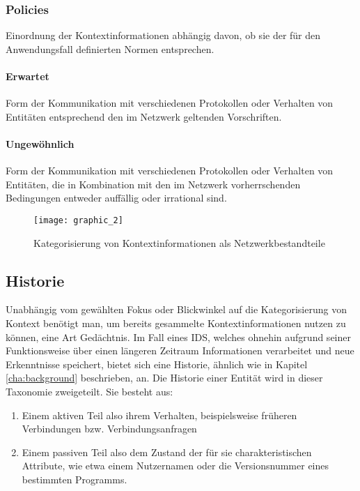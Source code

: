 \subsubsection{Policies}
Einordnung der Kontextinformationen abhängig davon, ob sie der für den Anwendungsfall definierten Normen entsprechen.
\paragraph{Erwartet}
Form der Kommunikation mit verschiedenen Protokollen oder Verhalten von Entitäten entsprechend den im Netzwerk geltenden Vorschriften.
\paragraph{Ungewöhnlich}
Form der Kommunikation mit verschiedenen Protokollen oder Verhalten von Entitäten, die in Kombination mit den im Netzwerk vorherrschenden Bedingungen entweder auffällig oder irrational sind.
\begin{figure}[H]
\centering
\texttt{[image: graphic\_2]}
\caption{Kategorisierung von Kontextinformationen als Netzwerkbestandteile}
\label{Tax_2} 
\end{figure}
\subsection{Historie}
Unabhängig vom gewählten Fokus oder Blickwinkel auf die Kategorisierung von Kontext benötigt man, um bereits gesammelte Kontextinformationen nutzen zu können, eine Art Gedächtnis. Im Fall eines IDS, welches ohnehin aufgrund seiner Funktionsweise über einen längeren Zeitraum Informationen verarbeitet und neue Erkenntnisse speichert, bietet sich eine Historie, ähnlich wie in Kapitel \ref{cha:background} beschrieben, an.
Die Historie einer Entität wird in dieser Taxonomie zweigeteilt. Sie besteht aus:
\begin{enumerate}
\item{Einem aktiven Teil also ihrem Verhalten, beispielsweise früheren Verbindungen bzw. Verbindungsanfragen}
\item{Einem passiven Teil also dem Zustand der für sie charakteristischen Attribute, wie etwa einem Nutzernamen oder die Versionsnummer eines bestimmten Programms. }
\end{enumerate}
